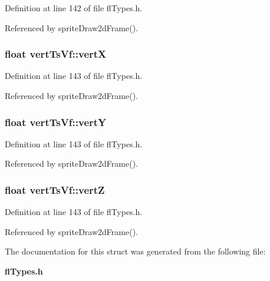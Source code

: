 Definition at line 142 of file fl\-Types.h.

Referenced by sprite\-Draw2d\-Frame().
\subsubsection{\setlength{\rightskip}{0pt plus 5cm}float {\bf vert\-Ts\-Vf::vert\-X}}\label{structvertTsVf_154bfa410aa44910ac19a7bbda885371}




Definition at line 143 of file fl\-Types.h.

Referenced by sprite\-Draw2d\-Frame().
\subsubsection{\setlength{\rightskip}{0pt plus 5cm}float {\bf vert\-Ts\-Vf::vert\-Y}}\label{structvertTsVf_d323745ce38169f9951d4937b7526f5a}




Definition at line 143 of file fl\-Types.h.

Referenced by sprite\-Draw2d\-Frame().
\subsubsection{\setlength{\rightskip}{0pt plus 5cm}float {\bf vert\-Ts\-Vf::vert\-Z}}\label{structvertTsVf_66ef3a5a24c0df4a2c902e029630a602}




Definition at line 143 of file fl\-Types.h.

Referenced by sprite\-Draw2d\-Frame().

The documentation for this struct was generated from the following file:\begin{CompactItemize}
\item 
{\bf fl\-Types.h}\end{CompactItemize}
